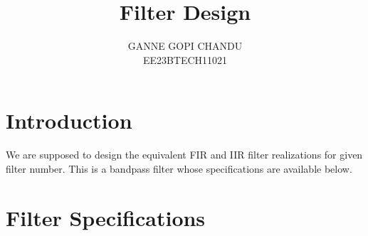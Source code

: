 \documentclass{article}
\begin{document}
\title{ \textbf{Filter Design}}

\author{GANNE GOPI CHANDU \\EE23BTECH11021}
\date{}

\maketitle
\section{Introduction}
We are supposed to design the equivalent FIR and IIR filter realizations for given filter number.  
This is a bandpass filter whose specifications are available below.

\section{Filter Specifications}
\end{document}
